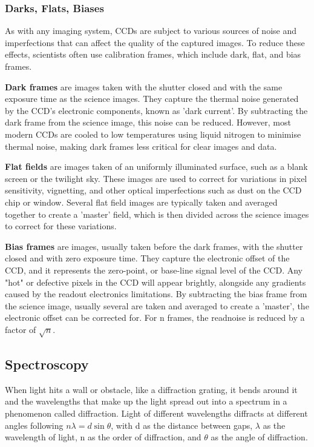 \documentclass[11pt, a4paper, twocolumn]{article}
\begin{document}
\subsubsection{Darks, Flats, Biases}

As with any imaging system, CCDs are subject to various sources of noise and imperfections that can affect the quality of the captured images.
To reduce these effects, scientists often use calibration frames, which include dark, flat, and bias frames.

\textbf{Dark frames} are images taken with the shutter closed and with the same exposure time as the science images. They capture the thermal 
noise generated by the CCD's electronic components, known as 'dark current'. By subtracting the dark frame from the science image, this 
noise can be reduced. However, most modern CCDs are cooled to low temperatures using liquid nitrogen to minimise thermal noise, 
making dark frames less critical for clear images and data. \cite{bakich2023intro,Tulloch2005CCDs,ccdsucd}

\textbf{Flat fields} are images taken of an uniformly illuminated surface, such as a blank screen or the twilight sky. These images are used to correct
for variations in pixel sensitivity, vignetting, and other optical imperfections such as dust on the CCD chip or window. Several flat field
images are typically taken and averaged together to create a 'master' field, which is then divided across the science images to correct for
these variations. \cite{bakich2023intro,Tulloch2005CCDs,ccdsucd}

\textbf{Bias frames} are images, usually taken before the dark frames, with the shutter closed and with zero exposure time. They capture the electronic
offset of the CCD, and it represents the zero-point, or base-line signal level of the CCD. Any "hot" or defective pixels in the CCD will 
appear brightly, alongside any gradients caused by the readout electronics limitations. By subtracting the bias frame from the science image,
usually several are taken and averaged to create a 'master', the electronic offset can be corrected for. For n frames, the readnoise is 
reduced by a factor of $\sqrt{n}$. \cite{bakich2023intro,Tulloch2005CCDs,ccdsucd}

\subsection{Spectroscopy}

When light hits a wall or obstacle, like a diffraction grating, it bends around it and the wavelengths that make up the light spread out into a 
spectrum in a phenomenon called diffraction. Light of different wavelengths diffracts at different angles following \( n\lambda = d \sin \theta\), with
d as the distance between gaps, \(\lambda\) as the wavelength of light, n as the order of diffraction, and \(\theta\) as the angle of diffraction.
\cite{ccdsucd}
\end{document}
